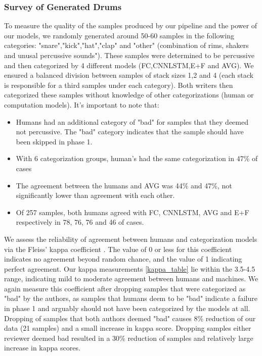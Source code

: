 \documentclass{nime-alternate} %
\begin{document}
\subsubsection{Survey of Generated Drums}
\label{survey}
To measure the quality of the samples produced by our pipeline and the power of our models, we randomly generated around 50-60 samples in the following categories: "snare","kick","hat","clap" and "other" (combination of rims, 
shakers and unusal percussive sounds"). These samples were determined to be percussive and then categorized by 4 different models (FC,CNNLSTM,E+F and AVG). We ensured a balanced division between samples of stack sizes 1,2 and 4 (each stack is responsible for a third samples under each category). Both writers then categorized these samples without knowledge of other categorizations (human or computation models). It's important to note that:
\begin{itemize}
    \item Humans had an additional category of "bad" for samples that they deemed not percussive. The "bad" category indicates that the sample should have been skipped in phase 1. 
    \item With 6 categorization groups, human's had the same categorization in 47\% of cases
    \item The agreement between the humans and AVG was 44\% and 47\%, not significantly lower than agreement with each other. 
    \item Of 257 samples, both humans agreed with FC, CNNLSTM, AVG and E+F respectively in 78, 76, 76 and 46 of cases.
\end{itemize}
We assess the reliability of agreement between humans and categorization models via the Fleiss' kappa coefficient \cite{fleiss1971measuring}. The value of 0 or less for this coefficient indicates no agreement beyond random chance, and the value of 1 indicating perfect agreement. Our kappa measurements \ref{kappa_table} lie within the 3.5-4.5 range, indicating mild to moderate agreement between humans and machines. We again measure this coefficient after dropping samples that were categorized as "bad" by the authors, as samples that humans deem to be "bad" indicate a failure in phase 1 and arguably should not have been categorized by the models at all. Dropping of samples that both authors deemed "bad" causes 8\% reduction of our data (21 samples) and a small increase in kappa score. Dropping samples either reviewer deemed bad resulted in a 30\% reduction of samples and relatively large increase in kappa scores. \\
\end{document}
